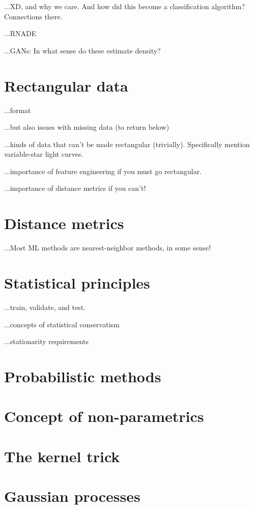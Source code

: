 \documentclass[12pt, letterpaper]{article}
\begin{document}
...XD, and why we care. And how did this become a classification algorithm? Connections there.

...RNADE

...GANs: In what sense do these estimate density?

\section{Rectangular data}

...format

...but also issues with missing data (to return below)

...kinds of data that can't be made rectangular (trivially). Specifically mention variable-star light curves.

...importance of feature engineering if you must go rectangular.

...importance of distance metrics if you can't!

\section{Distance metrics}

...Most ML methods are nearest-neighbor methods, in some sense!

\section{Statistical principles}

...train, validate, and test.

...concepts of statistical conservatism

...stationarity requirements

\section{Probabilistic methods}

\section{Concept of non-parametrics}

\section{The kernel trick}

\section{Gaussian processes}
\end{document}
